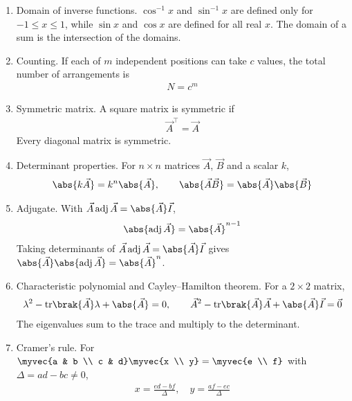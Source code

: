 \begin{enumerate}[label=\thesubsection.\arabic*, ref=\thesubsection.\theenumi]
\item Domain of inverse functions. $\cos^{-1}x$ and $\sin^{-1}x$ are defined only for $-1 \le x \le 1$, while $\sin x$ and $\cos x$ are defined for all real $x$. The domain of a sum is the intersection of the domains. 
\item Counting. If each of $m$ independent positions can take $c$ values, the total number of arrangements is
\begin{align}
	N = c^m \label{eq:CBSE12-count}
\end{align}
\item Symmetric matrix. A square matrix is symmetric if
\begin{align}
	\vec{A}^{\top} = \vec{A} \label{eq:CBSE12-symmetric}
\end{align}
Every diagonal matrix is symmetric.
\item Determinant properties. For $n\times n$ matrices $\vec{A}$, $\vec{B}$ and a scalar $k$,
\begin{align}
	\abs{k\vec{A}} = k^n\abs{\vec{A}}, \qquad \abs{\vec{A}\vec{B}} = \abs{\vec{A}}\abs{\vec{B}} \label{eq:CBSE12-det}
\end{align}
\item Adjugate. With $\vec{A}\,\text{adj}\,\vec{A} = \abs{\vec{A}}\vec{I}$,
\begin{align}
	\abs{\text{adj}\,\vec{A}} = \abs{\vec{A}}^{n-1} \label{eq:CBSE12-adj}
\end{align}
\solution
Taking determinants of $\vec{A}\,\text{adj}\,\vec{A} = \abs{\vec{A}}\vec{I}$ gives $\abs{\vec{A}}\abs{\text{adj}\,\vec{A}} = \abs{\vec{A}}^n$. 
\item Characteristic polynomial and Cayley--Hamilton theorem. For a $2\times2$ matrix,
\begin{align}
	\lambda^2 - \text{tr}\brak{\vec{A}}\lambda + \abs{\vec{A}} = 0, \qquad \vec{A}^2 - \text{tr}\brak{\vec{A}}\vec{A} + \abs{\vec{A}}\vec{I} = \vec{0} \label{eq:CBSE12-ch}
\end{align}
The eigenvalues sum to the trace and multiply to the determinant. 
\item Cramer's rule. For $\myvec{a & b \\ c & d}\myvec{x \\ y} = \myvec{e \\ f}$ with $\Delta = ad - bc \neq 0$,
\begin{align}
	x = \frac{ed - bf}{\Delta}, \quad y = \frac{af - ec}{\Delta} \label{eq:CBSE12-cramer}
\end{align}


\end{enumerate}
